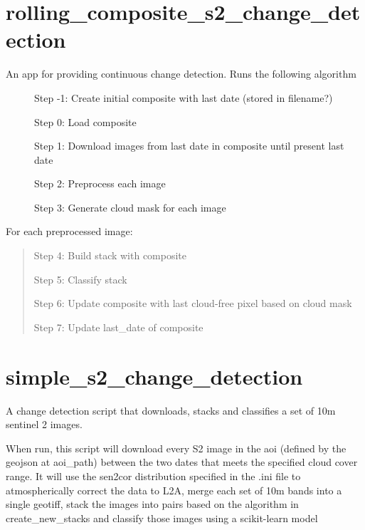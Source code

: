 \documentclass[letterpaper,10pt,english]{sphinxmanual}
\begin{document}
\section{rolling\_composite\_s2\_change\_detection}
\label{\detokenize{index:rolling-composite-s2-change-detection}}\begin{description}
\item[{An app for providing continuous change detection. Runs the following algorithm}] \leavevmode
Step -1: Create initial composite with last date (stored in filename?)

Step 0: Load composite

Step 1: Download images from last date in composite until present last date

Step 2: Preprocess each image

Step 3: Generate cloud mask for each image

\end{description}

For each preprocessed image:
\begin{quote}

Step 4: Build stack with composite

Step 5: Classify stack

Step 6: Update composite with last cloud-free pixel based on cloud mask

Step 7: Update last\_date of composite
\end{quote}
\label{\detokenize{index:module-pyeo.apps.change_detection.simple_s2_change_detection}}

\section{simple\_s2\_change\_detection}
\label{\detokenize{index:simple-s2-change-detection}}
A change detection script that downloads, stacks and classifies a set of 10m sentinel 2 images.

When run, this script will download every S2 image in the aoi (defined by the geojson at aoi\_path) between the two
dates that meets the specified cloud cover range. It will use the sen2cor distribution specified in the .ini file
to atmospherically correct the data to L2A, merge each set of 10m bands into a single geotiff, stack the images
into pairs based on the algorithm in create\_new\_stacks and classify those images using a scikit-learn model
\end{document}
